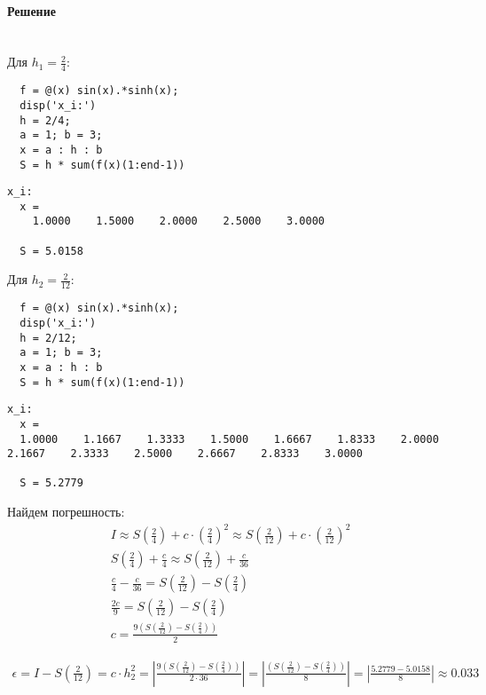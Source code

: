 \paragraph{Решение} ~\\
Для $h_{1}= \frac{2}{4}$:
\begin{lstlisting}
  f = @(x) sin(x).*sinh(x);
  disp('x_i:')
  h = 2/4;
  a = 1; b = 3;
  x = a : h : b
  S = h * sum(f(x)(1:end-1))

\end{lstlisting}
\begin{lstlisting}[backgroundcolor=\color{cyan}]
  x_i:
  x =
    1.0000    1.5000    2.0000    2.5000    3.0000

  S = 5.0158
\end{lstlisting}
Для $h_{2} = \frac{2}{12}$:
\begin{lstlisting}
  f = @(x) sin(x).*sinh(x);
  disp('x_i:')
  h = 2/12;
  a = 1; b = 3;
  x = a : h : b
  S = h * sum(f(x)(1:end-1))
\end{lstlisting}
\begin{lstlisting}[backgroundcolor=\color{cyan}]
  x_i:
  x =
  1.0000    1.1667    1.3333    1.5000    1.6667    1.8333    2.0000    2.1667    2.3333    2.5000    2.6667    2.8333    3.0000

  S = 5.2779
\end{lstlisting}

Найдем погрешность:
\begin{gather*}
  I \approx S\left(\frac{2}{4}\right) + c \cdot \left(\frac{2}{4}\right)^{2} \approx S\left(\frac{2}{12}\right) + c \cdot \left(\frac{2}{12}\right)^{2}\\[2mm]
  S\left(\frac{2}{4}\right) + \frac{c}{4} \approx S\left(\frac{2}{12}\right) + \frac{c}{36}\\[2mm]
  \frac{c}{4} - \frac{c}{36} = S\left(\frac{2}{12}\right) - S\left(\frac{2}{4}\right)\\[2mm]
  \frac{2c}{9} = S\left(\frac{2}{12}\right) - S\left(\frac{2}{4}\right)\\[2mm]
  c = \frac{9 \left(S\left(\frac{2}{12}\right) - S\left(\frac{2}{4}\right)\right)}{2}
\end{gather*}

\begin{align*}
  \epsilon = I - S\left(\frac{2}{12}\right) = c \cdot h_{2}^{2} = \left| \frac{9 \left(S\left(\frac{2}{12}\right) - S\left(\frac{2}{4}\right)\right)}{2 \cdot 36} \right| = \left| \frac{\left(S\left(\frac{2}{12}\right) - S\left(\frac{2}{4}\right)\right)}{8} \right| = \left|\frac{5.2779 - 5.0158}{8} \right| \approx 0.033
\end{align*}

